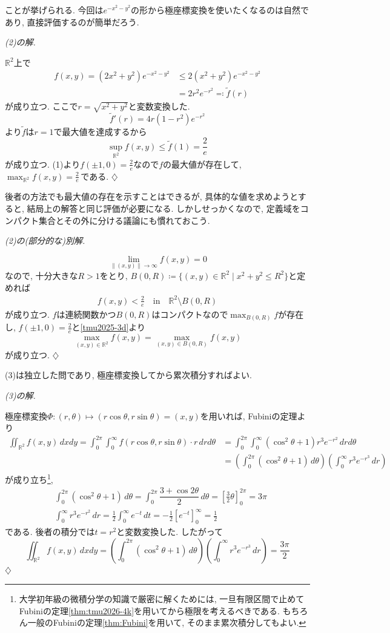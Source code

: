 \documentclass[titlepage]{jsarticle}
\numberwithin{equation}{section}
\newcommand{\R}{\mathbb{R}}%
\newenvironment{kaitou}[1][解]{%
\begin{proofbox}%
\textit{#1. }\ignorespaces
}{%
\hfill$\diamondsuit$%
\end{proofbox}%
}
\begin{document}
ことが挙げられる. 今回は$e^{-x^2 - y^2}$の形から極座標変換を使いたくなるのは自然であり, 直接評価するのが簡単だろう.
\begin{kaitou}[(2)の解]
$\R^2$上で
\begin{align*}
f(x, y) = (2x^2 + y^2)e^{-x^2-y^2} &\le 2(x^2 + y^2)e^{-x^2 - y^2}\\
& = 2r^2e^{-r^2} \eqcolon \tilde{f}(r)
\end{align*}
が成り立つ. ここで$r = \sqrt{x^2 + y^2}$と変数変換した.
\[
\tilde{f}'(r) = 4r(1-r^2)e^{-r^2}
\]
より$\tilde{f}$は$r=1$で最大値を達成するから
\[
\sup_{\R^2} f(x, y) \le \tilde{f}(1) = \dfrac{2}{e}
\]
が成り立つ. (1)より$f(\pm 1, 0) = \frac{2}{e}$なので$f$の最大値が存在して, $\displaystyle{\max_{\R^2}f(x, y)} = \boxed{\frac{2}{e}}$\,である.
\end{kaitou}
後者の方法でも最大値の存在を示すことはできるが, 具体的な値を求めようとすると, 結局上の解答と同じ評価が必要になる. しかしせっかくなので, 定義域をコンパクト集合とその外に分ける議論にも慣れておこう.
\begin{kaitou}[(2)の(部分的な)別解]
\[
\lim_{\|(x, y)\| \to \infty} f(x, y) = 0
\]
なので, 十分大きな$R > 1$をとり, $B(0, R) \coloneq \{(x, y) \in \R^2 \mid x^2 + y^2 \le R^2\}$と定めれば
\begin{align}
f(x, y) < \frac{2}{e}\quad \text{in}\quad\R^2 \setminus B(0, R) \label{tmu2025-3d}
\end{align}
が成り立つ. $f$は連続関数かつ$B(0, R)$はコンパクトなので$\max_{B(0, R)} f$が存在し, $f(\pm1, 0) = \frac{2}{e}$と\eqref{tmu2025-3d}より
\[
\max_{(x, y) \in \R^2} f(x, y) = \max_{(x, y) \in B(0, R)} f(x, y)
\]
が成り立つ.
\end{kaitou}
(3)は独立した問であり, 極座標変換してから累次積分すればよい.
\begin{kaitou}[(3)の解]
極座標変換$\Phi : (r, \theta) \mapsto (r\cos\theta, r\sin\theta) = (x, y)$を用いれば, Fubiniの定理より
\begin{align*}
\iint_{\R^2}f(x, y)\,dxdy = \int_0^{2\pi} \int_0^\infty f(r\cos\theta, r\sin\theta)\cdot r\,drd\theta &= \int_0^{2\pi} \int_0^\infty (\cos^2\theta + 1)r^3e^{-r^2}\,drd\theta\\
&= \left(\int_0^{2\pi} (\cos^2\theta + 1)\,d\theta \right)\left(\int_0^\infty r^3e^{-r^3}\,dr\right)
\end{align*}
が成り立ち\footnote{大学初年級の微積分学の知識で厳密に解くためには, 一旦有限区間で止めてFubiniの定理\ref{thm:tmu2026-4k}を用いてから極限を考えるべきである. もちろん一般のFubiniの定理\ref{thm:Fubini}を用いて, そのまま累次積分してもよい.}, 
\begin{align*}
&\int_0^{2\pi}  (\cos^2\theta + 1)\,d\theta = \int_0^{2\pi} \dfrac{3+\cos 2\theta}{2}\,d\theta = \left[\frac{3}{2}\theta\right]_0^{2\pi} = 3\pi\\
&\int_0^\infty r^3e^{-r^2}\,dr = \frac{1}{2}\int_0^\infty e^{-t}\,dt = -\frac{1}{2}\left[e^{-t}\right]_0^\infty = \frac{1}{2}
\end{align*}
である. 後者の積分では$t = r^2$と変数変換した. したがって
\[
\iint_{\R^2}f(x, y)\,dxdy = \left(\int_0^{2\pi} (\cos^2\theta + 1)\,d\theta \right)\left(\int_0^\infty r^3e^{-r^3}\,dr\right) = \boxed{\frac{3\pi}{2}}
\]
\end{kaitou}
\end{document}
